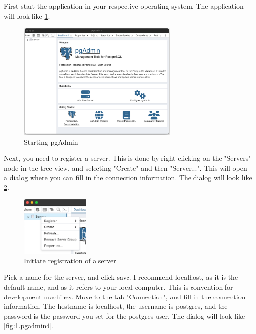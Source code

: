 First start the application in your respective operating system. The application will look like \cref{fig:1.pgadmin1}.
\begin{figure}[H]
    \centering
    \includegraphics[width=0.7\textwidth]{content/1-relational-databases/figures/pgadmin/1.png}
    \caption{Starting pgAdmin}
    \label{fig:1.pgadmin1}
\end{figure}

Next, you need to register a server. This is done by right clicking on the "Servers" node in the tree view, and selecting "Create" and then "Server...". This will open a dialog where you can fill in the connection information. The dialog will look like \cref{fig:1.pgadmin2}.

\begin{figure}[H]
    \centering
    \includegraphics[width=0.3\textwidth]{content/1-relational-databases/figures/pgadmin/2.png}
    \caption{Initiate registration of a server}
    \label{fig:1.pgadmin2}
\end{figure}




Pick a name for the server, and click save. I recommend localhost, as it is the default name, and as it refers to your local computer. This is convention for development machines. 
Move to the tab "Connection", and fill in the connection information. The hostname is localhost, the username is postgres, and the password is the password you set for the postgres user. The dialog will look like \cref{fig:1.pgadmin4}.

